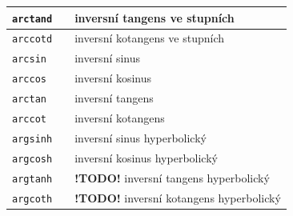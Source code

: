 \documentclass[a4paper,10pt]{article}
\begin{document}
\begin{tabularx}{\textwidth}{|l|l|X|}
    \verb+arctand+ && inversní tangens ve stupních\\\hline
    \verb+arccotd+ && inversní kotangens ve stupních\\\hline
    \verb+arcsin+  && inversní sinus\\\hline
    \verb+arccos+  && inversní kosinus\\\hline
    \verb+arctan+ && inversní tangens\\\hline
    \verb+arccot+ && inversní kotangens\\\hline 
    \verb+argsinh+  && inversní sinus hyperbolický\\\hline
    \verb+argcosh+  && inversní kosinus hyperbolický\\\hline

    \verb+argtanh+  && {\bf !TODO!} inversní tangens hyperbolický\\\hline
    \verb+argcoth+  && {\bf !TODO!} inversní kotangens hyperbolický\\\hline
\end{tabularx}
\end{document}
